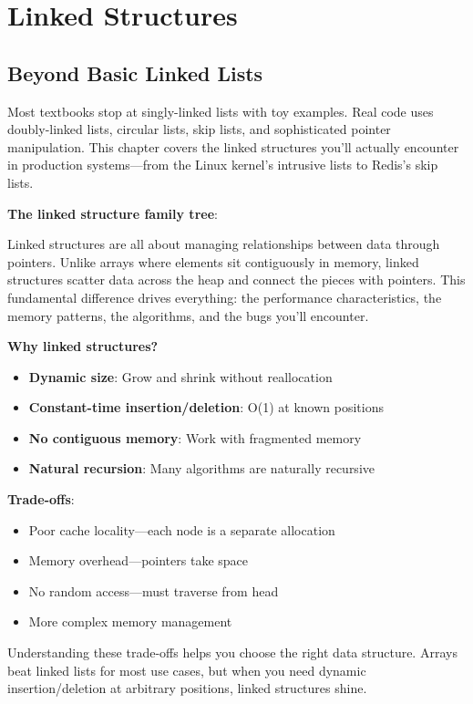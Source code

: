 \chapter{Linked Structures}

\section{Beyond Basic Linked Lists}

Most textbooks stop at singly-linked lists with toy examples. Real code uses doubly-linked lists, circular lists, skip lists, and sophisticated pointer manipulation. This chapter covers the linked structures you'll actually encounter in production systems---from the Linux kernel's intrusive lists to Redis's skip lists.

\textbf{The linked structure family tree}:

Linked structures are all about managing relationships between data through pointers. Unlike arrays where elements sit contiguously in memory, linked structures scatter data across the heap and connect the pieces with pointers. This fundamental difference drives everything: the performance characteristics, the memory patterns, the algorithms, and the bugs you'll encounter.

\textbf{Why linked structures?}

\begin{itemize}
    \item \textbf{Dynamic size}: Grow and shrink without reallocation
    \item \textbf{Constant-time insertion/deletion}: O(1) at known positions
    \item \textbf{No contiguous memory}: Work with fragmented memory
    \item \textbf{Natural recursion}: Many algorithms are naturally recursive
\end{itemize}

\textbf{Trade-offs}:

\begin{itemize}
    \item Poor cache locality---each node is a separate allocation
    \item Memory overhead---pointers take space
    \item No random access---must traverse from head
    \item More complex memory management
\end{itemize}

Understanding these trade-offs helps you choose the right data structure. Arrays beat linked lists for most use cases, but when you need dynamic insertion/deletion at arbitrary positions, linked structures shine.

